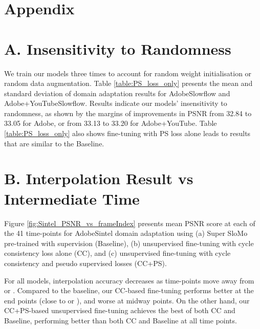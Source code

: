 \documentclass[10pt,twocolumn,letterpaper]{article}
\renewcommand{\textrightarrow}{}
\begin{document}
\clearpage
\onecolumn
\section*{Appendix}
\section*{A. Insensitivity to Randomness}
We train our models three times to account for random weight initialisation or random data augmentation. Table \ref{table:PS_loss_only} presents the mean and standard deviation of domain adaptation results for Adobe\textrightarrow Slowflow and Adobe+YouTube\textrightarrow Slowflow. Results indicate our models' insensitivity to randomness, as shown by the margins of improvements in PSNR from 32.84 to 33.05 for Adobe, or from 33.13 to 33.20 for Adobe+YouTube. Table \ref{table:PS_loss_only} also shows fine-tuning with PS loss alone leads to results that are similar to the Baseline.

\section*{B. Interpolation Result vs Intermediate Time}
Figure \ref{fig:Sintel_PSNR_vs_frameIndex} presents mean PSNR score at each of the 41 time-points for Adobe\textrightarrow Sintel domain adaptation using (a) Super SloMo~\cite{jiang2018super} pre-trained with supervision (Baseline), (b) unsupervised fine-tuning with cycle consistency loss alone (CC), and (c) unsupervised fine-tuning with cycle consistency and pseudo supervised losses (CC+PS). 

For all models, interpolation accuracy decreases as time-points move away from  or . Compared to the baseline, our CC-based fine-tuning performs better at the end points (close to  or ), and worse at midway points. On the other hand, our CC+PS-based unsupervised fine-tuning achieves the best of both CC and Baseline, performing better than both CC and Baseline at all time points.
\end{document}
